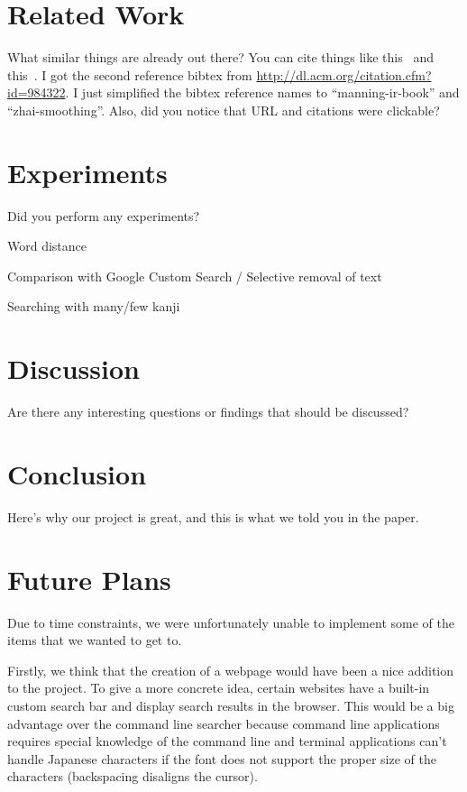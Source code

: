 \documentclass{acm} %
\begin{document}
\begin{CJK}{UTF8}{zhsong}
\section{Related Work}

What similar things are already out there? You can cite things like
this~\cite{manning-ir-book} and this~\cite{zhai-smoothing}. I got the second
reference bibtex from \url{http://dl.acm.org/citation.cfm?id=984322}. I just
simplified the bibtex reference names to ``manning-ir-book'' and
``zhai-smoothing''. Also, did you notice that URL and citations were clickable?

\section{Experiments}

Did you perform any experiments?

Word distance

Comparison with Google Custom Search / Selective removal of text

Searching with many/few kanji

\section{Discussion}

Are there any interesting questions or findings that should be discussed?

\section{Conclusion}

Here's why our project is great, and this is what we told you in the paper.

\section{Future Plans}

Due to time constraints, we were unfortunately unable to implement some of the items that we wanted to get to.

Firstly, we think that the creation of a webpage would have been a nice addition to the project. To give a more concrete idea, certain websites have a built-in custom search bar and display search results in the browser. This would be a big advantage over the command line searcher because command line applications requires special knowledge of the command line and terminal applications can't handle Japanese characters if the font does not support the proper size of the characters (backspacing disaligns the cursor).


\end{CJK}
\end{document}
